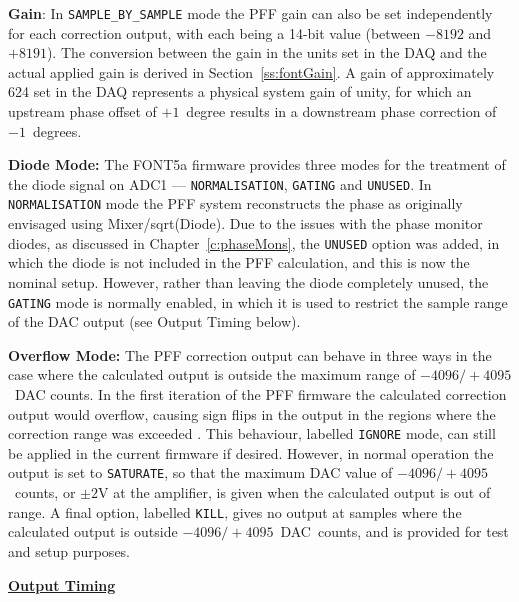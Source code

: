 
\textbf{Gain}: In \texttt{SAMPLE\_BY\_SAMPLE} mode the PFF gain can also be set independently for each correction output, with each being a 14-bit value (between \(-8192\) and \(+8191\)). The conversion between the gain in the units set in the DAQ and the actual applied gain is derived in Section~\ref{ss:fontGain}. A gain of approximately 624 set in the DAQ represents a physical system gain of unity, for which an upstream phase offset of \(+1\)~degree results in a downstream phase correction of \(-1\)~degrees.

\textbf{Diode Mode:} The FONT5a firmware provides three modes for the treatment of the diode signal on ADC1 --- \texttt{NORMALISATION}, \texttt{GATING} and \texttt{UNUSED}. In \texttt{NORMALISATION} mode the PFF system reconstructs the phase as originally envisaged using Mixer/sqrt(Diode). Due to the issues with the phase monitor diodes, as discussed in Chapter~\ref{c:phaseMons}, the \texttt{UNUSED} option was added, in which the diode is not included in the PFF calculation, and this is now the nominal setup. However, rather than leaving the diode completely unused, the \texttt{GATING} mode is normally enabled, in which it is used to restrict the sample range of the DAC output (see Output Timing below).

\textbf{Overflow Mode:} The PFF correction output can behave in three ways in the case where the calculated output is outside the maximum range of \({-4096/+4095}\)~DAC counts. In the first iteration of the PFF firmware the calculated correction output would overflow, causing sign flips in the output in the regions where the correction range was exceeded \cite{glennPriv}. This behaviour, labelled \texttt{IGNORE} mode, can still be applied in the current firmware if desired. However, in normal operation the output is set to \texttt{SATURATE}, so that the maximum DAC value of \({-4096/+4095}\)~counts, or \(\pm2\)V at the amplifier, is given when the calculated output is out of range. A final option, labelled \texttt{KILL}, gives no output at samples where the calculated output is outside \({-4096/+4095}\)~DAC~counts, and is provided for test and setup purposes.

\vspace{0.2cm}
\noindent\underline{\textbf{Output Timing}}

